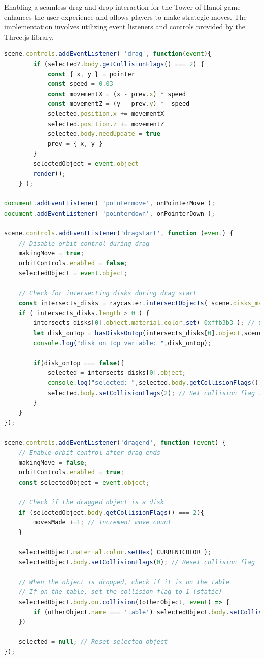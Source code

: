 \documentclass{article}
\begin{document}
Enabling a seamless drag-and-drop interaction for the Tower of Hanoi game enhances the user experience and allows players to make strategic moves. The implementation involves utilizing event listeners and controls provided by the Three.js library.

\begin{lstlisting}[language=JavaScript, caption={Drag-and-Drop Interaction}]
    scene.controls.addEventListener( 'drag', function(event){
        if (selected?.body.getCollisionFlags() === 2) {
            const { x, y } = pointer
            const speed = 0.03
            const movementX = (x - prev.x) * speed
            const movementZ = (y - prev.y) * -speed
            selected.position.x += movementX
            selected.position.z += movementZ
            selected.body.needUpdate = true
            prev = { x, y }
        }
        selectedObject = event.object
        render();
    } );

document.addEventListener( 'pointermove', onPointerMove );
document.addEventListener( 'pointerdown', onPointerDown );

scene.controls.addEventListener('dragstart', function (event) {
    // Disable orbit control during drag
    makingMove = true;
    orbitControls.enabled = false;
    selectedObject = event.object;

    // Check for intersecting disks during drag start
    const intersects_disks = raycaster.intersectObjects( scene.disks_mashes, true );
    if ( intersects_disks.length > 0 ) {
        intersects_disks[0].object.material.color.set( 0xffb3b3 ); // Change color of selected object
        let disk_onTop = hasDisksOnTop(intersects_disks[0].object,scene.disks_mashes);
        console.log("disk on top variable: ",disk_onTop);

        if(disk_onTop === false){
            selected = intersects_disks[0].object;
            console.log("selected: ",selected.body.getCollisionFlags());
            selected.body.setCollisionFlags(2); // Set collision flag for the dragged disk
        }
    }
});

scene.controls.addEventListener('dragend', function (event) {
    // Enable orbit control after drag ends
    makingMove = false;
    orbitControls.enabled = true;
    const selectedObject = event.object;

    // Check if the dragged object is a disk
    if (selectedObject.body.getCollisionFlags() === 2){
        movesMade +=1; // Increment move count
    }

    selectedObject.material.color.setHex( CURRENTCOLOR );
    selectedObject.body.setCollisionFlags(0); // Reset collision flag

    // When the object is dropped, check if it is on the table
    // If on the table, set the collision flag to 1 (static)
    selectedObject.body.on.collision((otherObject, event) => {
        if (otherObject.name === 'table') selectedObject.body.setCollisionFlags(1);
    })

    selected = null; // Reset selected object
});
\end{lstlisting}
\end{document}
